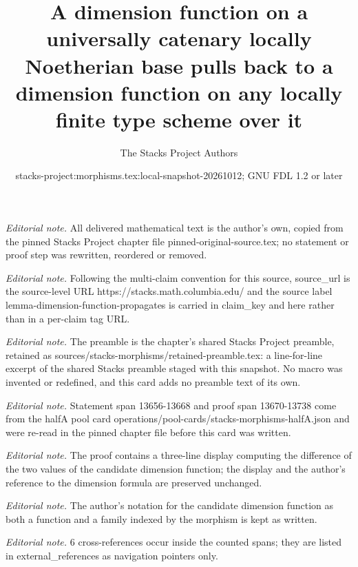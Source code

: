 \documentclass[10pt,a4paper]{amsart}
\title{A dimension function on a universally catenary locally Noetherian base pulls back to a dimension function on any locally finite type scheme over it}
\author{The Stacks Project Authors}
\date{stacks-project:morphisms.tex:local-snapshot-20261012; GNU FDL 1.2 or later}
\theoremstyle{plain}
\theoremstyle{definition}
\theoremstyle{remark}
\numberwithin{equation}{subsection}
\begin{document}
\maketitle
\noindent\textit{Editorial note.} All delivered mathematical text is the author's own, copied from the pinned Stacks Project chapter file pinned-original-source.tex; no statement or proof step was rewritten, reordered or removed.\par\medskip
\noindent\textit{Editorial note.} Following the multi-claim convention for this source, source\_url is the source-level URL https://stacks.math.columbia.edu/ and the source label lemma-dimension-function-propagates is carried in claim\_key and here rather than in a per-claim tag URL.\par\medskip
\noindent\textit{Editorial note.} The preamble is the chapter's shared Stacks Project preamble, retained as sources/stacks-morphisms/retained-preamble.tex: a line-for-line excerpt of the shared Stacks preamble staged with this snapshot. No macro was invented or redefined, and this card adds no preamble text of its own.\par\medskip
\noindent\textit{Editorial note.} Statement span 13656-13668 and proof span 13670-13738 come from the halfA pool card operations/pool-cards/stacks-morphisms-halfA.json and were re-read in the pinned chapter file before this card was written.\par\medskip
\noindent\textit{Editorial note.} The proof contains a three-line display computing the difference of the two values of the candidate dimension function; the display and the author's reference to the dimension formula are preserved unchanged.\par\medskip
\noindent\textit{Editorial note.} The author's notation for the candidate dimension function as both a function and a family indexed by the morphism is kept as written.\par\medskip
\noindent\textit{Editorial note.} 6 cross-references occur inside the counted spans; they are listed in external\_references as navigation pointers only.\par\medskip
\end{document}
